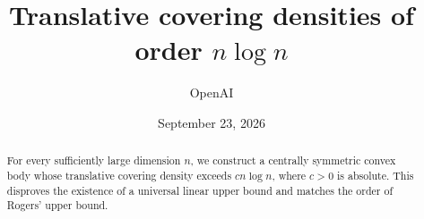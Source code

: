 \documentclass[11pt]{article}
\title{Translative covering densities of order $n\log n$}
\author{OpenAI}
\date{September 23, 2026}
\theoremstyle{definition}
\theoremstyle{remark}
\numberwithin{equation}{section}
\begin{document}
\maketitle
\begin{abstract}
For every sufficiently large dimension $n$, we construct a centrally symmetric
convex body whose translative covering density exceeds $c n\log n$,
where $c>0$ is absolute. This disproves the existence of a universal linear
upper bound and matches the order of Rogers' upper bound.
\end{abstract}
\tableofcontents
\clearpage









\appendix

\begingroup
\raggedright


\endgroup
\end{document}
